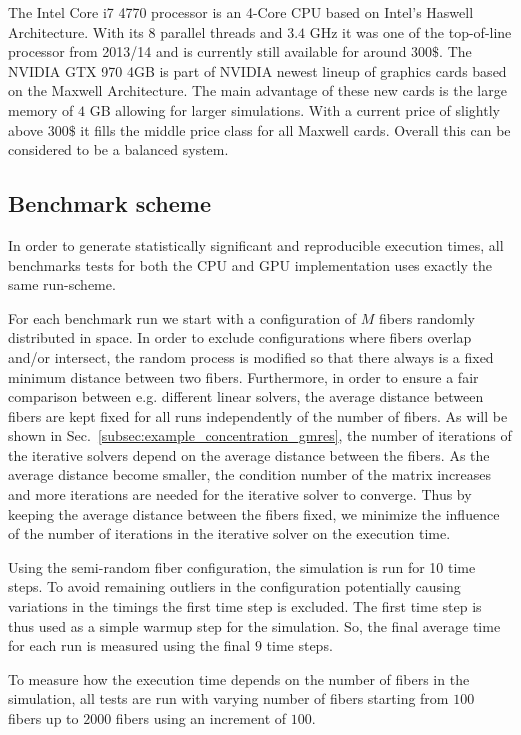 The Intel Core i7 4770 processor is an 4-Core CPU based on Intel's Haswell Architecture. With its 8 parallel threads and $3.4$ GHz it was one of the top-of-line processor from 2013/14 and is currently still available for around $300\$$. The NVIDIA GTX 970 4GB is part of NVIDIA newest lineup of graphics cards based on the Maxwell Architecture. The main advantage of these new cards is the large memory of $4$ GB allowing for larger simulations. With a current price of slightly above $300\$$ it fills the middle price class for all Maxwell cards. Overall this can be considered to be a balanced system.

\subsection{Benchmark scheme}
\label{subsec:benchmark_scheme}

In order to generate statistically significant and reproducible execution times, all benchmarks tests for both the CPU and GPU implementation uses exactly the same run-scheme.

For each benchmark run we start with a configuration of $M$ fibers randomly distributed in space. In order to exclude configurations where fibers overlap and/or intersect, the random process is modified so that there always is a fixed minimum distance between two fibers. Furthermore, in order to ensure a fair comparison between e.g. different linear solvers, the average distance between fibers are kept fixed for all runs independently of the number of fibers. As will be shown in Sec.~\ref{subsec:example_concentration_gmres}, the number of iterations of the iterative solvers depend on the average distance between the fibers. As the average distance become smaller, the condition number of the matrix increases and more iterations are needed for the iterative solver to converge. Thus by keeping the average distance between the fibers fixed, we minimize the influence of the number of iterations in the iterative solver on the execution time.

Using the semi-random fiber configuration, the simulation is run for 10 time steps. To avoid remaining outliers in the configuration potentially causing variations in the timings the first time step is excluded. The first time step is thus used as a simple warmup step for the simulation. So, the final average time for each run is measured using the final $9$ time steps.

To measure how the execution time depends on the number of fibers in the simulation, all tests are run with varying number of fibers starting from $100$ fibers up to $2000$ fibers using an increment of $100$.

